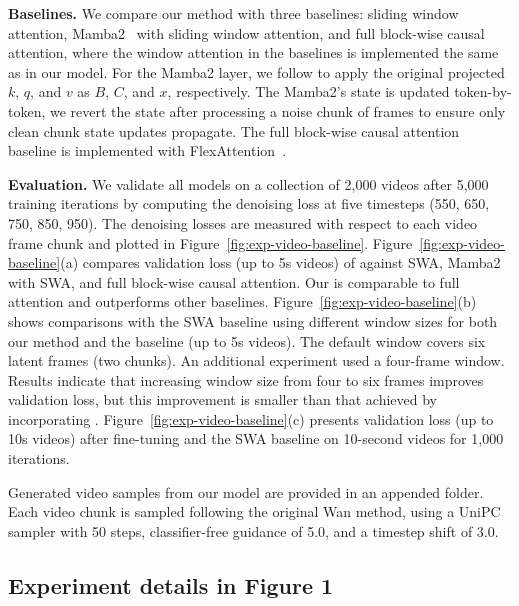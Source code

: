 \noindent\textbf{Baselines.}
We compare our method with three baselines: sliding window attention, Mamba2~\cite{dao2024transformers} with sliding window attention, and full block-wise causal attention, where the window attention in the baselines is implemented the same as in our model. 
For the Mamba2 layer, we follow \cite{wang2024mambainllama} to apply the original projected $k$, $q$, and $v$ as $B$, $C$, and $x$, respectively. The Mamba2's state is updated token-by-token, we revert the state after processing a noise chunk of frames to ensure only clean chunk state updates propagate.
The full block-wise causal attention baseline is implemented with FlexAttention~\cite{he2024flexattention}. 



\noindent\textbf{Evaluation.} We validate all models on a collection of 2,000 videos after 5,000 training iterations by computing the denoising loss at five timesteps (550, 650, 750, 850, 950). 
The denoising losses are measured with respect to each video frame chunk and plotted in Figure~\ref{fig:exp-video-baseline}. Figure~\ref{fig:exp-video-baseline}(a) compares validation loss (up to 5s videos) of \methodname{} against SWA, Mamba2 with SWA, and full block-wise causal attention. Our \methodname{} is comparable to full attention and outperforms other baselines. Figure~\ref{fig:exp-video-baseline}(b) shows comparisons with the SWA baseline using different window sizes for both our method and the baseline (up to 5s videos). The default window covers six latent frames (two chunks). An additional experiment used a four-frame window. Results indicate that increasing window size from four to six frames improves validation loss, but this improvement is smaller than that achieved by incorporating \methodname{}. 
Figure~\ref{fig:exp-video-baseline}(c) presents validation loss (up to 10s videos) after fine-tuning \methodname{} and the SWA baseline on 10-second videos for 1,000 iterations.

Generated video samples from our model are provided in an appended folder. Each video chunk is sampled following the original Wan method, using a UniPC~\cite{zhao2023unipc} sampler with 50 steps, classifier-free guidance of 5.0, and a timestep shift of 3.0. 

\subsection{Experiment details in Figure 1}
\label{sec:appen_figure_1_details}

